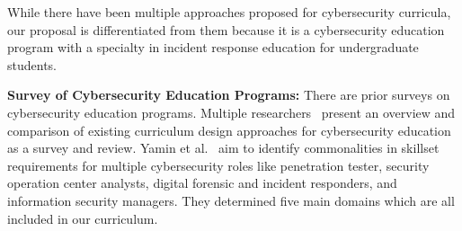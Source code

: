\documentclass{article}
\begin{document}
While there have been multiple approaches proposed for cybersecurity curricula, our proposal is differentiated from them because it is a cybersecurity education program with a specialty in incident response education for undergraduate students.


\textbf{Survey of Cybersecurity Education Programs:}
There are prior surveys on cybersecurity education programs.
Multiple researchers~\cite{CABAJ201824,CHOWDHURY2021100361,inbook,9042416,8688137}
 present an overview and comparison of existing curriculum design approaches for cybersecurity education as a survey and review.
%
%
%
%
Yamin et al.~\cite{10.1145/3339252.3340527}
aim to identify commonalities in skillset requirements for multiple cybersecurity roles like penetration tester, security operation center analysts, digital forensic and incident responders, and information security managers. They determined five main domains which are all included in our curriculum.











\end{document}
